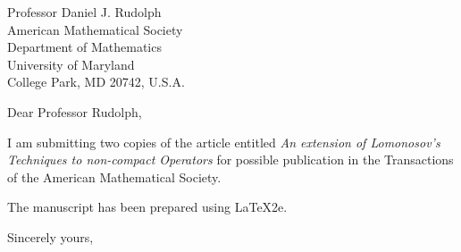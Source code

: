 \documentclass{letter}
\begin{document}
\begin{letter}{
 Professor Daniel J. Rudolph   \\
 American Mathematical Society \\
 Department of Mathematics     \\
 University of Maryland        \\
 College Park, MD 20742, U.S.A. }

\opening{Dear Professor Rudolph,}
I am submitting two copies of the article entitled {\em An
extension of Lomonosov's Techniques to non-compact Operators} for
possible publication in the Transactions of the American
Mathematical Society.

The manuscript has been prepared using \LaTeX2e.

\closing{Sincerely yours,}
\end{letter}
\end{document}
